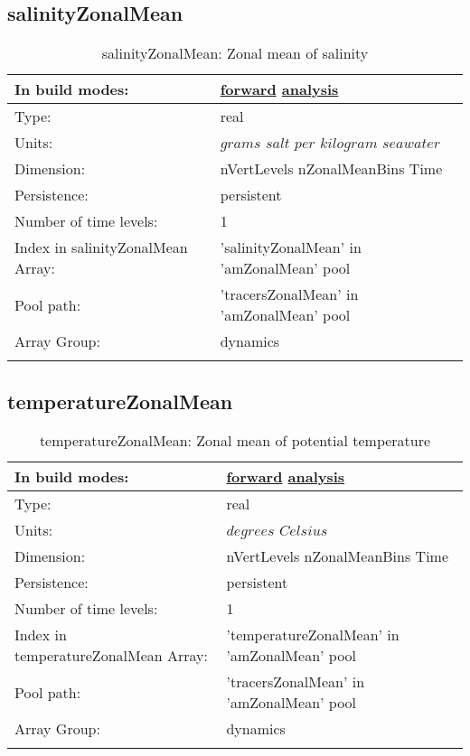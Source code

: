 \subsection[salinityZonalMean]{salinityZonalMean}
\label{subsec:var_sec_amZonalMean_salinityZonalMean}
\begin{center}
\begin{longtable}{| p{2.0in} | p{4.0in} |}
        \hline 
        In build modes: & \hyperref[subsec:forward_var_tab_amZonalMean]{forward} \hyperref[subsec:analysis_var_tab_amZonalMean]{analysis} \\
        \hline 
        Type: & real \\
        \hline 
        Units: & $grams$ $salt$ $per$ $kilogram$ $seawater$ \\
        \hline 
        Dimension: & nVertLevels nZonalMeanBins Time \\
        \hline 
        Persistence: & persistent \\
        \hline 
        Number of time levels: & 1 \\
        \hline 
		 Index in salinityZonalMean Array: & 'salinityZonalMean' in 'amZonalMean' pool \\
		 \hline 
            Pool path: & 'tracersZonalMean' in 'amZonalMean' pool
 \\
		 \hline 
		 Array Group: & dynamics \\
		 \hline 
    \caption{salinityZonalMean: Zonal mean of salinity}
\end{longtable}
\end{center}
\subsection[temperatureZonalMean]{temperatureZonalMean}
\label{subsec:var_sec_amZonalMean_temperatureZonalMean}
\begin{center}
\begin{longtable}{| p{2.0in} | p{4.0in} |}
        \hline 
        In build modes: & \hyperref[subsec:forward_var_tab_amZonalMean]{forward} \hyperref[subsec:analysis_var_tab_amZonalMean]{analysis} \\
        \hline 
        Type: & real \\
        \hline 
        Units: & $degrees$ $Celsius$ \\
        \hline 
        Dimension: & nVertLevels nZonalMeanBins Time \\
        \hline 
        Persistence: & persistent \\
        \hline 
        Number of time levels: & 1 \\
        \hline 
		 Index in temperatureZonalMean Array: & 'temperatureZonalMean' in 'amZonalMean' pool \\
		 \hline 
            Pool path: & 'tracersZonalMean' in 'amZonalMean' pool
 \\
		 \hline 
		 Array Group: & dynamics \\
		 \hline 
    \caption{temperatureZonalMean: Zonal mean of potential temperature}
\end{longtable}
\end{center}
